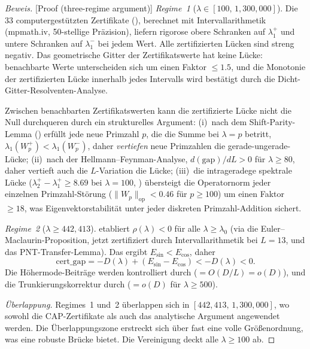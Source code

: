 \documentclass[12pt,a4paper]{article}
\theoremstyle{definition}
\theoremstyle{remark}
\begin{document}
\begin{proof}[Beweis][Proof (three-regime argument)]
\emph{Regime~1} ($\lambda \in [100,\, 1{,}300{,}000]$). Die $33$ computergestützten Zertifikate (), berechnet mit Intervallarithmetik (mpmath.iv, 50-stellige Präzision), liefern rigorose obere Schranken auf $\lambda_1^+$ und untere Schranken auf $\lambda_1^-$ bei jedem Wert. Alle zertifizierten Lücken sind streng negativ. Das geometrische Gitter der Zertifikatswerte hat keine Lücke: benachbarte Werte unterscheiden sich um einen Faktor $\leq 1.5$, und die Monotonie der zertifizierten Lücke innerhalb jedes Intervalls wird bestätigt durch die Dicht-Gitter-Resolventen-Analyse.

Zwischen benachbarten Zertifikatswerten kann die zertifizierte Lücke nicht die Null durchqueren durch ein strukturelles Argument: (i)~nach dem Shift-Parity-Lemma () erfüllt jede neue Primzahl $p$, die die Summe bei $\lambda = p$ betritt, $\lambda_1(W_p^+) < \lambda_1(W_p^-)$, daher \emph{vertiefen} neue Primzahlen die gerade-ungerade-Lücke; (ii)~nach der Hellmann--Feynman-Analyse, $d(\mathrm{gap})/dL > 0$ für $\lambda \geq 80$, daher vertieft auch die $L$-Variation die Lücke; (iii)~die intrageradege spektrale Lücke ($\lambda_2^+ - \lambda_1^+ \geq 8.69$ bei $\lambda = 100$, ) übersteigt die Operatornorm jeder einzelnen Primzahl-Störung ($\|W_p\|_{\mathrm{op}} < 0.46$ für $p \geq 100$) um einen Faktor $\geq 18$, was Eigenvektorstabilität unter jeder diskreten Primzahl-Addition sichert.

\emph{Regime~2} ($\lambda \geq 442{,}413$).  etabliert $\rho(\lambda) < 0$ für alle $\lambda \geq \lambda_0$ (via die Euler--Maclaurin-Proposition, jetzt zertifiziert durch Intervallarithmetik bei $L = 13$, und das PNT-Transfer-Lemma). Das ergibt $E_{\sin} < E_{\cos}$, daher
\[
  \mathrm{cert\_gap} = -D(\lambda) + (E_{\sin} - E_{\cos}) < -D(\lambda) < 0.
\]
Die Höhermode-Beiträge werden kontrolliert durch  ($= O(D/L) = o(D)$), und die Trunkierungskorrektur durch  ($= o(D)$ für $\lambda \geq 500$).

\emph{Überlappung.} Regimes~1 und~2 überlappen sich in $[442{,}413,\, 1{,}300{,}000]$, wo sowohl die CAP-Zertifikate als auch das analytische Argument angewendet werden. Die Überlappungszone erstreckt sich über fast eine volle Größenordnung, was eine robuste Brücke bietet. Die Vereinigung deckt alle $\lambda \geq 100$ ab.
\end{proof}
\end{document}
